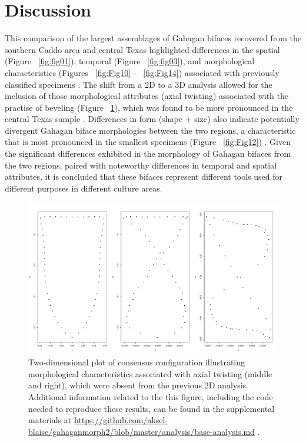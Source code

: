 \documentclass[review]{elsarticle}
\begin{document}
\section*{Discussion}

This comparison of the largest assemblages of Gahagan bifaces recovered from the southern Caddo area and central Texas highlighted differences in the spatial (Figure ~\ref{fig:fig01}), temporal (Figure ~\ref{fig:fig03}), and morphological characteristics (Figures ~\ref{fig:Fig10} - ~\ref{fig:Fig14}) associated with previously classified specimens \citep{RN20850}. The shift from a 2D to a 3D analysis allowed for the inclusion of those morphological attributes (axial twisting) associated with the practise of beveling (Figure ~\ref{fig:Fig15}), which was found to be more pronounced in the central Texas sample \citep{RN20850}. Differences in form (shape + size) also indicate potentially divergent Gahagan biface morphologies between the two regions, a characteristic that is most pronounced in the smallest specimens (Figure ~\ref{fig:Fig12}) \citep{RN20850}. Given the significant differences exhibited in the morphology of Gahagan bifaces from the two regions, paired with noteworthy differences in temporal and spatial attributes, it is concluded that these bifaces represent different tools used for different purposes in different culture areas.

\begin{figure}[h]\centering
\includegraphics[width=\linewidth]{fig15.pdf}
\caption{Two-dimensional plot of consensus configuration illustrating morphological characteristics associated with axial twisting (middle and right), which were absent from the previous 2D analysis. Additional information related to the this figure, including the code needed to reproduce these results, can be found in the supplemental materials at \href{https://github.com/aksel-blaise/gahaganmorph2/blob/master/analysis/base-analysis.md}{https://github.com/aksel-blaise/gahaganmorph2/blob/master/analysis/base-analysis.md} \citep{RN20850}.}
\label{fig:Fig15}
\end{figure}
\end{document}
